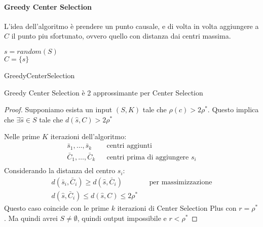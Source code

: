 \paragraph{Greedy Center Selection}
L'idea dell'algoritmo è prendere un punto causale, e di volta in volta 
aggiungere a $C$ il punto piu sfortunato, ovvero quello con distanza dai centri massima.

\begin{algorithm}[H]
    \SetAlgoLined

    $s = \mathit{random}(S)$\\
    $C = \{s\}$\\
     \caption{GreedyCenterSelection}
\end{algorithm}

\begin{theorem}
    Greedy Center Selection è 2 approssimante per Center Selection
\end{theorem}
\begin{proof}
    Supponiamo esista un input $(S,K)$ tale che $\rho(c) > 2\rho^*$.
    Questo implica che $\exists \hat{s} \in S$ tale che $d(\hat{s}, C) > 2\rho^*$ 

    Nelle prime $K$ iterazioni dell'algoritmo:
    \begin{equation}
        \begin{aligned}
            \bar{s}_1, \dots, \bar{s}_k && \text{centri aggiunti}\\
            \bar{C}_1, \dots, \bar{C}_k && \text{centri prima di aggiungere } s_i\\
        \end{aligned}
    \end{equation}
    Considerando la distanza del centro $s_i$:
    \begin{equation}
        \begin{aligned}
            d(\bar{s}_i,\bar{C}_i) \geq d(\hat{s},\bar{C}_i) && \text{per massimizzazione}\\
            d(\hat{s},\bar{C}_i) \leq d(\hat{s}, C) \leq 2\rho^*
        \end{aligned}
    \end{equation}
    Questo caso coincide con le prime $k$ iterazioni di Center Selection Plus con $r = \rho^*$.
    Ma quindi avrei $S \neq \emptyset$, quindi output impossibile e $r < \rho^*$
\end{proof}


